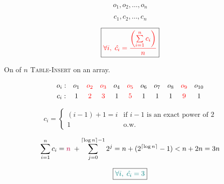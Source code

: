 
\begin{frame}{}
  \centerline{}

  \vspace{0.50cm}
\end{frame}

\begin{frame}{}
  \[
    o_1, o_2, \ldots, o_n
  \]

  \[
    c_1, c_2, \ldots, c_n
  \]

  \pause
  \[
    \boxed{\textcolor{red}{\forall i,\; \hat{c_i} = \frac{\left(\sum\limits_{i = 1}^{n} c_i\right)}{n}}}
  \]
\end{frame}

\begin{frame}{}
  \centerline{}

  \pause
  \vspace{0.30cm}
  \centerline{On  of $n$ \textsc{Table-Insert} on an  array.}

  \pause
  \vspace{0.30cm}
  \[
    \begin{array}{ccccccccccc}
      o_i:  & o_1 & \textcolor{red}{o_2} & \textcolor{red}{o_3} & o_4 & \textcolor{red}{o_5} & o_6 & o_7 & o_8 & \textcolor{red}{o_9} & o_{10} \\[3pt]
      c_i:  & 1 & \textcolor{red}{2} & \textcolor{red}{3} & 1 & \textcolor{red}{5} & 1 & 1 & 1 & \textcolor{red}{9} & 1  \\
    \end{array}
  \]

  \pause
  \vspace{0.30cm}
  \begin{displaymath}
    c_i = \left\{ \begin{array}{ll}
      (i-1)+1 = i & \textrm{if $i - 1$ is an exact power of 2}\\
      1 & \textrm{o.w.}
    \end{array} \right.
  \end{displaymath}

  \pause
  \vspace{0.30cm}
  \[
    \sum_{i=1}^{n} c_i = \textcolor{purple}{n}\; + \sum_{j=0}^{\lceil \log n \rceil - 1} 2^{j} 
      = n + (2^{\lceil \log n \rceil} - 1) < n + 2n = 3n
  \]

  \pause
  \[
    \boxed{\textcolor{teal}{\forall i,\; \hat{c_i} = 3}}
  \]
\end{frame}
